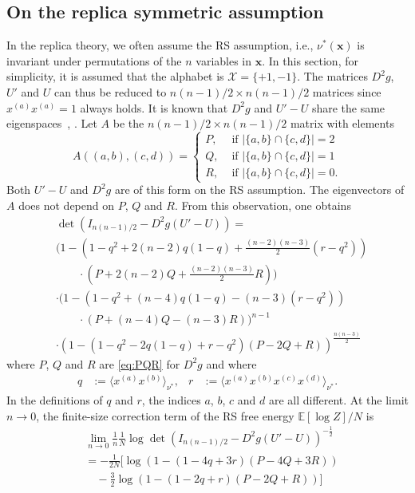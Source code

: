 \documentclass[conference,twocolumns]{IEEEtran}
\theoremstyle{plain}
\begin{document}
\subsection{On the replica symmetric assumption}
In the replica theory, we often assume the RS assumption, i.e., $\nu^*(\bm{x})$ is invariant under permutations of the $n$ variables in $\bm{x}$.
In this section, for simplicity, it is assumed that the alphabet is $\mathcal{X}=\{+1,-1\}$.
The matrices $D^2g$, $U'$ and $U$ can thus be reduced to $n(n-1)/2\times n(n-1)/2$ matrices since $x^{(a)}x^{(a)}=1$ always holds.
It is known that $D^2g$ and $U'-U$ share the same eigenspaces~\cite{almeida1978stability}, \cite{tanaka2002statistical}.
Let $A$ be the $n(n-1)/2\times n(n-1)/2$ matrix with elements
\begin{equation}
A((a,b),(c,d))=\begin{cases}
P,& \text{ if } |\{a,b\}\cap\{c,d\}|=2\\
Q,& \text{ if } |\{a,b\}\cap\{c,d\}|=1\\
R,& \text{ if } |\{a,b\}\cap\{c,d\}|=0.
\end{cases}
\label{eq:PQR}
\end{equation}
Both $U'-U$ and $D^2g$ are of this form on the RS assumption.
The eigenvectors of $A$ does not depend on $P$, $Q$ and $R$.
From this observation, one obtains
\begin{align*}
&\det\left(I_{n(n-1)/2}-D^2g(U'-U)\right) =\\
&\bigg(1
-\left(1-q^2 + 2(n-2)q(1-q) + \frac{(n-2)(n-3)}2 (r-q^2)\right)\\
&\qquad\cdot\left(P+2(n-2)Q+\frac{(n-2)(n-3)}2R\right)\bigg)\\
&\cdot\Big(1-\left(1-q^2 + (n-4)q(1-q) - (n-3)(r-q^2)\right)\\
&\qquad\cdot\left(P+(n-4)Q-(n-3)R\right)\Big)^{n-1}\\
&\cdot\left(1-\left(1-q^2 - 2q(1-q) + r-q^2\right)\left(P-2Q+R\right)\right)^{\frac{n(n-3)}2}
\end{align*}
where $P$, $Q$ and $R$ are \eqref{eq:PQR} for $D^2g$ and where
\begin{align*}
q&:=\langle x^{(a)}x^{(b)}\rangle_{\nu^*},&
r&:=\langle x^{(a)}x^{(b)}x^{(c)}x^{(d)}\rangle_{\nu^*}.
\end{align*}
In the definitions of $q$ and $r$, the indices $a$, $b$, $c$ and $d$ are all different.
At the limit $n\to0$, the finite-size correction term of the RS free energy $\mathbb{E}[\log Z]/N$ is
\begin{align*}
&\lim_{n\to 0}\frac1n\frac1N\log\det\left(I_{n(n-1)/2}-D^2g(U'-U)\right)^{-\frac12} \\
&=-\frac1{2N}\bigg[\log\left(1-\left(1- 4q +3r\right)\left(P-4Q+3R\right)\right)\\
&\quad -\frac32\log\left(1-\left(1-2q+r\right)\left(P-2Q+R\right)\right)\bigg]
\end{align*}
\end{document}
